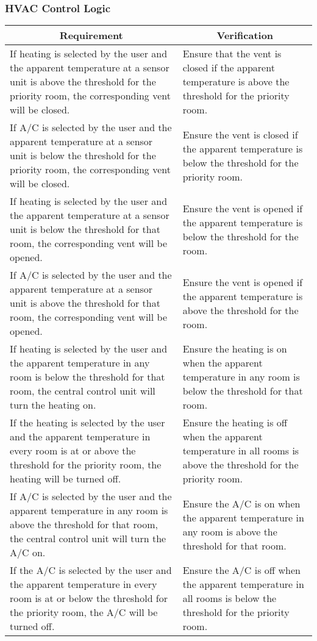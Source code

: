 \subsubsection{HVAC Control Logic}
\begin{tabular}{|p{\mytabwidth}|p{\mytabwidth}|}
\hline
\multicolumn{1}{|c|}{Requirement} & \multicolumn{1}{|c|}{Verification} \\
\hline\hline
If heating is selected by the user and the apparent temperature at a sensor unit is above the threshold for the priority room, the corresponding vent will be closed. &
Ensure that the vent is closed if the apparent temperature is above the threshold for the priority room. \\
\hline
If A/C is selected by the user and the apparent temperature at a sensor unit is below the threshold for the priority room, the corresponding vent will be closed. &
Ensure the vent is closed if the apparent temperature is below the threshold for the priority room. \\
\hline
If heating is selected by the user and the apparent temperature at a sensor unit is below the threshold for that room, the corresponding vent will be opened. &
Ensure the vent is opened if the apparent temperature is below the threshold for the room. \\
\hline
If A/C is selected by the user and the apparent temperature at a sensor unit is above the threshold for that room, the corresponding vent will be opened. &
Ensure the vent is opened if the apparent temperature is above the threshold for the room. \\
\hline
If heating is selected by the user and the apparent temperature in any room is below the threshold for that room, the central control unit will turn the heating on. &
Ensure the heating is on when the apparent temperature in any room is below the threshold for that room. \\
\hline
If the heating is selected by the user and the apparent temperature in every room is at or above the threshold for the priority room, the heating will be turned off. &
Ensure the heating is off when the apparent temperature in all rooms is above the threshold for the priority room. \\
\hline
If A/C is selected by the user and the apparent temperature in any room is above the threshold for that room, the central control unit will turn the A/C on. &
Ensure the A/C is on when the apparent temperature in any room is above the threshold for that room. \\
\hline
If the A/C is selected by the user and the apparent temperature in every room is at or below the threshold for the priority room, the A/C will be turned off. &
Ensure the A/C is off when the apparent temperature in all rooms is below the threshold for the priority room. \\
\hline
\end{tabular}

